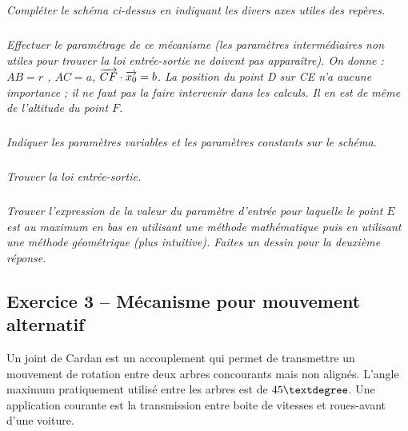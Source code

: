 \documentclass[11pt,oneside]{article}
\begin{document}
\subparagraph{}
\textit{Compléter le schéma ci-dessus en indiquant les divers axes utiles des repères.}




\subparagraph{}
\textit{Effectuer le paramétrage de ce mécanisme (les paramètres intermédiaires non utiles pour trouver la loi entrée-sortie ne doivent pas apparaître). On donne : $AB = r$ , $AC = a$, $\overrightarrow{CF}\cdot\overrightarrow{x_0}=b$. La position du point D sur CE n'a aucune importance ; il ne faut pas la faire intervenir dans les calculs. Il en est de même de l'altitude du point $F$.}




\subparagraph{}
\textit{Indiquer les paramètres variables et les paramètres constants sur le schéma.}




\subparagraph{}
\textit{Trouver la loi entrée-sortie. }




\subparagraph{}
\textit{Trouver l'expression de la valeur du paramètre d'entrée pour laquelle le point $E$ est au maximum en bas en utilisant une méthode mathématique puis en utilisant une méthode géométrique (plus intuitive). Faites un dessin pour la deuxième réponse.}




\subsection*{Exercice 3 -- Mécanisme pour mouvement alternatif}
\setcounter{subparagraph}{0}


Un joint de Cardan est un accouplement qui permet de transmettre un mouvement de rotation entre deux arbres concourants mais non alignés. L'angle maximum pratiquement utilisé entre les arbres est de $45\textdegree$. Une application courante est la transmission entre boite de vitesses  et roues-avant d’une voiture. 
\end{document}
